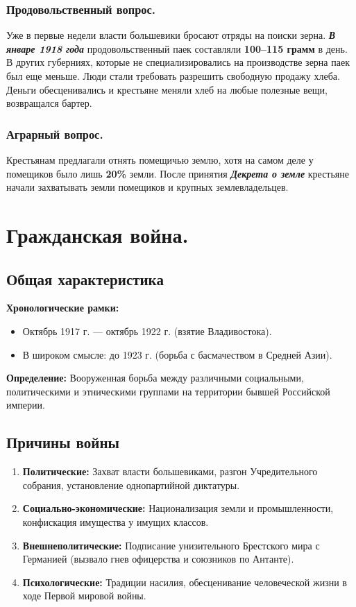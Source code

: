 \documentclass[12pt]{article}
\begin{document}
	\subsubsection{Продовольственный вопрос.}
	Уже в первые недели власти большевики бросают отряды на поиски зерна. \textbf{\textit{В январе 1918 года}} продовольственный паек составляли \textbf{100--115 грамм} в день. В других губерниях, которые не специализировались на производстве зерна паек был еще меньше. Люди стали требовать разрешить свободную продажу хлеба. Деньги обесценивались и крестьяне меняли хлеб на любые полезные вещи, возвращался бартер.
	\subsubsection{Аграрный вопрос.}
	Крестьянам предлагали отнять помещичью землю, хотя на самом деле у помещиков было лишь \textbf{20\%} земли. После принятия \textbf{\textit{Декрета о земле}} крестьяне начали захватывать земли помещиков и крупных землевладельцев.
	\section{Гражданская война.}
	
	\subsection{Общая характеристика}
	\textbf{Хронологические рамки:} 
	\begin{itemize}
		\item Октябрь 1917 г. --- октябрь 1922 г. (взятие Владивостока).
		\item В широком смысле: до 1923 г. (борьба с басмачеством в Средней Азии).
	\end{itemize}
	
	\textbf{Определение:} Вооруженная борьба между различными социальными, политическими и этническими группами на территории бывшей Российской империи.
	
	\subsection{Причины войны}
	\begin{enumerate}
		\item \textbf{Политические:} Захват власти большевиками, разгон Учредительного собрания, установление однопартийной диктатуры.
		\item \textbf{Социально-экономические:} Национализация земли и промышленности, конфискация имущества у имущих классов.
		\item \textbf{Внешнеполитические:} Подписание унизительного Брестского мира с Германией (вызвало гнев офицерства и союзников по Антанте).
		\item \textbf{Психологические:} Традиции насилия, обесценивание человеческой жизни в ходе Первой мировой войны.
	\end{enumerate}
	
\end{document}
